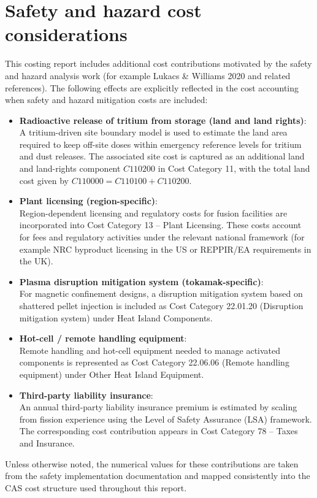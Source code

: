 \ifsafetycosts
\section*{Safety and hazard cost considerations}

This costing report includes additional cost contributions motivated by the
safety and hazard analysis work (for example Lukacs \& Williams 2020 and
related references). The following effects are explicitly reflected in the
cost accounting when safety and hazard mitigation costs are included:

\begin{itemize}
  \item \textbf{Radioactive release of tritium from storage (land and land rights)}:\\
  A tritium-driven site boundary model is used to estimate the land area
  required to keep off-site doses within emergency reference levels for
  tritium and dust releases. The associated site cost is captured as an
  additional land and land-rights component \(C110200\) in Cost Category 11,
  with the total land cost given by \(C110000 = C110100 + C110200\).

  \item \textbf{Plant licensing (region-specific)}:\\
  Region-dependent licensing and regulatory costs for fusion facilities
  are incorporated into Cost Category 13 – Plant Licensing. These costs
  account for fees and regulatory activities under the relevant national
  framework (for example NRC byproduct licensing in the US or REPPIR/EA
  requirements in the UK).

  \item \textbf{Plasma disruption mitigation system (tokamak-specific)}:\\
  For magnetic confinement designs, a disruption mitigation system based
  on shattered pellet injection is included as Cost Category 22.01.20
  (Disruption mitigation system) under Heat Island Components.

  \item \textbf{Hot-cell / remote handling equipment}:\\
  Remote handling and hot-cell equipment needed to manage activated
  components is represented as Cost Category 22.06.06 (Remote handling
  equipment) under Other Heat Island Equipment.

  \item \textbf{Third-party liability insurance}:\\
  An annual third-party liability insurance premium is estimated by
  scaling from fission experience using the Level of Safety Assurance
  (LSA) framework. The corresponding cost contribution appears in
  Cost Category 78 – Taxes and Insurance.
\end{itemize}

Unless otherwise noted, the numerical values for these contributions are
taken from the safety implementation documentation and mapped consistently
into the CAS cost structure used throughout this report.
\fi

